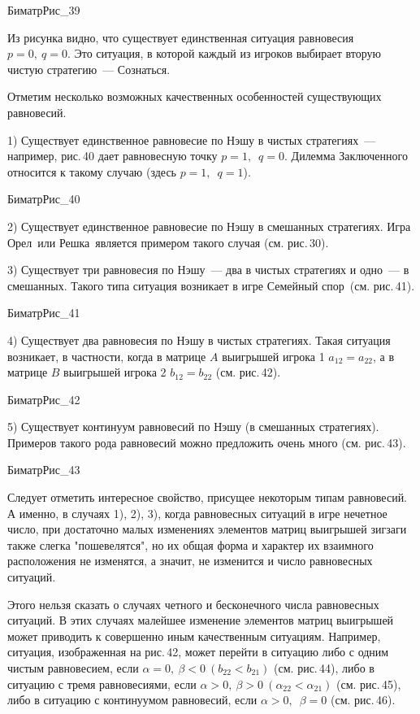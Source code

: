 \documentclass[12pt]{article}
\begin{document}
БиматрРис_39


Из рисунка видно, что
существует единственная ситуация равновесия $p=0,~q=0$.  Это
ситуация, в которой каждый из игроков выбирает вторую чистую
стратегию~--- Сознаться.

Отметим несколько возможных качественных особенностей существующих
равновесий.

1) Существует единственное равновесие по Нэшу в чистых стратегиях~---
например, рис.\,40 дает равновесную точку $p=1,$\, $q=0.$ Дилемма
Заключенного\, относится к такому случаю (здесь $p=1,$\, $q=1$).


БиматрРис_40


2) Существует единственное равновесие по Нэшу в смешанных стратегиях.
Игра Орел\, или Решка\, является примером такого случая (см. рис.\,30).

3) Существует три равновесия по Нэшу~--- два в чистых стратегиях и одно~--- в
смешанных.  Такого типа ситуация возникает в игре Семейный спор\,
(см. рис.\,41).


БиматрРис_41



4) Существует два равновесия по Нэшу в чистых стратегиях.
Такая ситуация возникает, в частности, когда в матрице $A$
выигрышей игрока 1 $a_{12}=a_{22}$,
а в матрице $B $ выигрышей игрока 2 $ b_{12}=b_{22}$ (см. рис.\,42).


БиматрРис_42


5) Существует континуум равновесий по Нэшу (в смешанных стратегиях).
Примеров такого рода равновесий можно предложить очень много
(см.  рис.\,43).


БиматрРис_43



Следует отметить интересное свойство,
присущее некоторым типам равновесий.  А именно, в случаях 1), 2), 3),
когда равновесных ситуаций в игре  нечетное число, при достаточно
малых изменениях элементов матриц выигрышей зигзаги также слегка
"пошевелятся", но их общая форма и характер их взаимного расположения
не изменятся, а значит, не изменится и число равновесных ситуаций.

Этого нельзя сказать о случаях четного и бесконечного числа
равновесных ситуаций. В этих случаях малейшее изменение элементов
матриц выигрышей может приводить к совершенно иным качественным
ситуациям. Например, ситуация, изображенная на рис.\,42,  может
перейти в ситуацию либо с одним чистым равновесием, если $\alpha
=0,~\beta <0~(b_{22}<b_{21})$ (см. рис.\,44), либо в ситуацию с
тремя равновесиями, если $\alpha >0,~\beta >0~(\alpha _{22}<\alpha
_{21})$ (см. рис.\,45), либо в ситуацию с континуумом равновесий,
если $\alpha >0,$\, $\beta =0 $ (см. рис.\,46).
\end{document}
